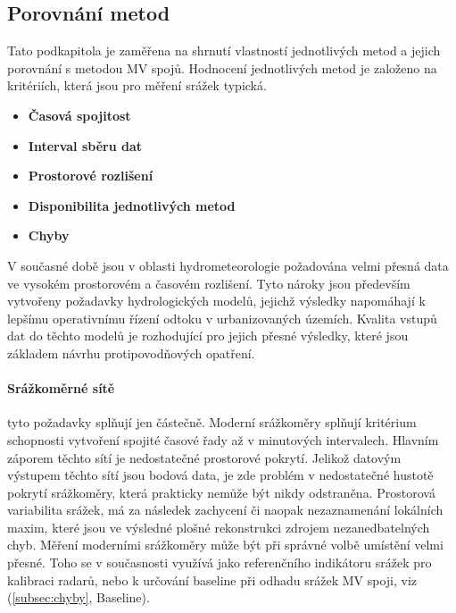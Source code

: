 \documentclass[a4paper,12pt,oneside]{report}
\begin{document}
\subsection{Porovnání metod}
Tato podkapitola je zaměřena na shrnutí vlastností jednotlivých metod
a jejich porovnání s metodou MV spojů. Hodnocení jednotlivých metod je
založeno na kritériích, která jsou pro měření srážek typická.
\begin{itemize}
\item\textbf{Časová spojitost}
\item\textbf{Interval sběru dat}  
\item\textbf{Prostorové rozlišení}
\item\textbf{Disponibilita jednotlivých metod}
\item\textbf{Chyby}
\end{itemize}
V současné době jsou v oblasti hydrometeorologie požadována velmi
přesná data ve vysokém prostorovém a časovém rozlišení. Tyto nároky
jsou především vytvořeny požadavky hydrologických modelů, jejichž
výsledky napomáhají k lepšímu operativnímu řízení odtoku v
urbanizovaných územích. Kvalita vstupů dat do těchto modelů je
rozhodující pro jejich přesné výsledky, které jsou základem
návrhu protipovodňových opatření.

\paragraph*{Srážkoměrné sítě} 
tyto požadavky splňují jen částečně. Moderní srážkoměry splňují
kritérium schopnosti vytvoření spojité časové řady až v minutových
intervalech. Hlavním záporem těchto sítí je nedostatečné prostorové pokrytí. 
Jelikož datovým výstupem těchto sítí jsou bodová data, je zde
problém v nedostatečné hustotě pokrytí srážkoměry, která prakticky
nemůže být nikdy odstraněna. Prostorová variabilita  srážek,
 má za následek zachycení či naopak nezaznamenání lokálních maxim, které jsou ve
výsledné plošné rekonstrukci zdrojem nezanedbatelných chyb. Měření
moderními srážkoměry může být při správné volbě umístění velmi
přesné. Toho se v současnosti využívá jako referenčního indikátoru
srážek pro kalibraci radarů, nebo k určování baseline při odhadu
srážek MV spoji, viz (\ref{subsec:chyby}, Baseline).
\end{document}
